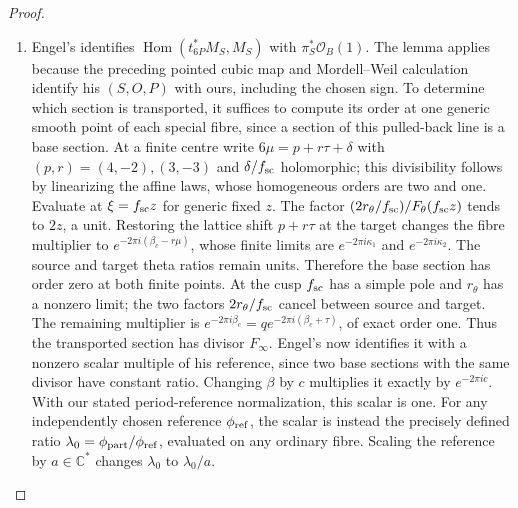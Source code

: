 \begin{proof}
\begin{enumerate}[label=\arabic*.,leftmargin=*]
\item Engel's \cite[Lemma~2.1, pp.~3--4]{Engel2026} identifies $\operatorname{Hom}(t_{6P}^*M_S,M_S)$ with $\pi_S^*\mathcal O_B(1)$. The lemma applies because the preceding pointed cubic map and Mordell--Weil calculation identify his $(S,O,P)$ with ours, including the chosen sign. To determine which section is transported, it suffices to compute its order at one generic smooth point of each special fibre, since a section of this pulled-back line is a base section. At a finite centre write $6\mu=p+r\tau+\delta$ with $(p,r)=(4,-2),(3,-3)$ and $\delta/f_{\rm sc}$ holomorphic; this divisibility follows by linearizing the affine laws, whose homogeneous orders are two and one. Evaluate at $\xi=f_{\rm sc}z$ for generic fixed $z$. The factor $(2r_\theta/f_{\rm sc})/F_\theta(f_{\rm sc}z)$ tends to $2z$, a unit. Restoring the lattice shift $p+r\tau$ at the target changes the fibre multiplier to $e^{-2\pi i(\beta_c-r\mu)}$, whose finite limits are $e^{-2\pi i\kappa_1}$ and $e^{-2\pi i\kappa_2}$. The source and target theta ratios remain units. Therefore the base section has order zero at both finite points. At the cusp $f_{\rm sc}$ has a simple pole and $r_\theta$ has a nonzero limit; the two factors $2r_\theta/f_{\rm sc}$ cancel between source and target. The remaining multiplier is
$e^{-2\pi i\beta_c}=q e^{-2\pi i(\beta_c+\tau)}$, of exact order one. Thus the transported section has divisor $F_\infty$. Engel's \cite[Corollary~2.2, p.~4]{Engel2026} now identifies it with a nonzero scalar multiple of his reference, since two base sections with the same divisor have constant ratio. Changing $\beta$ by $c$ multiplies it exactly by $e^{-2\pi ic}$. With our stated period-reference normalization, this scalar is one. For any independently chosen reference $\phi_{\rm ref}$, the scalar is instead the precisely defined ratio $\lambda_0=\phi_{\rm part}/\phi_{\rm ref}$, evaluated on any ordinary fibre. Scaling the reference by $a\in\mathbb C^*$ changes $\lambda_0$ to $\lambda_0/a$.
\end{enumerate}
\end{proof}